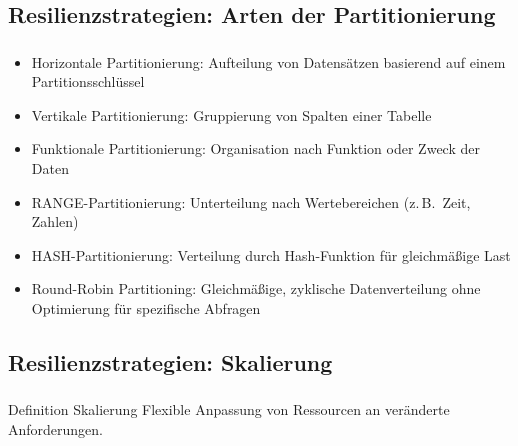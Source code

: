 \subsection{Resilienzstrategien: Arten der Partitionierung}
\begin{frame}
    \frametitle{\insertsection}
    \framesubtitle{\insertsubsection}
        \begin{itemize}
            \item Horizontale Partitionierung: Aufteilung von Datensätzen basierend auf einem Partitionsschlüssel
            \item Vertikale Partitionierung: Gruppierung von Spalten einer Tabelle
            \item Funktionale Partitionierung: Organisation nach Funktion oder Zweck der Daten
            \item RANGE-Partitionierung: Unterteilung nach Wertebereichen (z.\,B.\ Zeit, Zahlen)
            \item HASH-Partitionierung: Verteilung durch Hash-Funktion für gleichmäßige Last
            \item Round-Robin Partitioning: Gleichmäßige, zyklische Datenverteilung ohne Optimierung für spezifische Abfragen
        \end{itemize}
\end{frame}



\subsection{Resilienzstrategien: Skalierung}
\begin{frame}
    \frametitle{\insertsection}
    \framesubtitle{\insertsubsection}

    \begin{block}{Definition Skalierung}
Flexible Anpassung von Ressourcen an veränderte Anforderungen.
    \end{block}
\end{frame}

